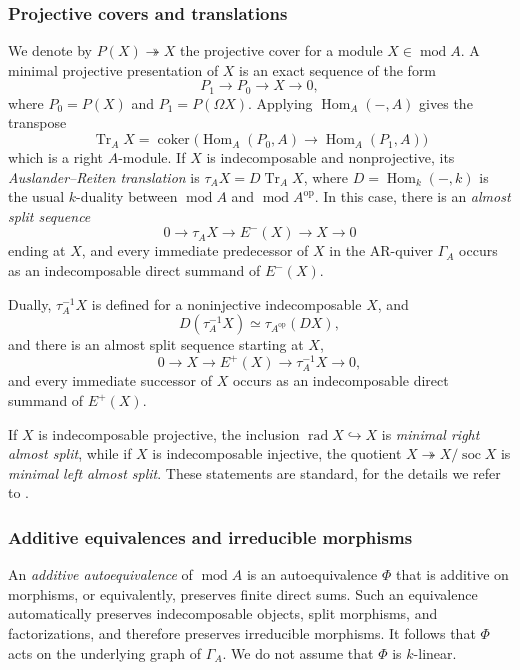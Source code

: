 \documentclass[11pt,letterpaper,reqno]{amsart}
\theoremstyle{definition}
\DeclareMathOperator{\Hom}{Hom}
\DeclareMathOperator{\rad}{rad}
\DeclareMathOperator{\soc}{soc}
\DeclareMathOperator{\Tr}{Tr}
\newcommand{\modcat}{\operatorname{mod}}
\newcommand{\op}{\mathrm{op}}
\begin{document}
\subsubsection{Projective covers and translations} We denote by $P(X)\twoheadrightarrow X$ the projective cover for a module $X\in\modcat A$.  A minimal projective
presentation of $X$ is an exact sequence of the form
\[
P_1\longrightarrow P_0\longrightarrow X\longrightarrow0,\]
where $P_0=P(X)$ and $P_1=P(\Omega X).$
Applying $\Hom_A(-,A)$ gives the transpose
\begin{equation}\label{eq:tr}
\Tr_AX
 =\operatorname{coker}\bigl(
 \Hom_A(P_0,A)\longrightarrow\Hom_A(P_1,A)
 \bigr)
\end{equation}
which is a right $A$-module. 
If $X$ is
indecomposable and nonprojective, its \emph{Auslander--Reiten translation} is $\tau_AX=D\Tr_AX$, where $D=\Hom_k(-,k)$ is the usual $k$-duality between $\modcat A$ and $\modcat A^{\op}$.  
In this case, there is an \emph{almost split sequence}
\[
0\longrightarrow\tau_AX\longrightarrow E^-(X)
\longrightarrow X\longrightarrow0
\]
ending at $X$, and every immediate predecessor of $X$ in the AR-quiver $\Gamma_A$ occurs as an indecomposable direct
summand of $E^-(X)$.  


Dually, $\tau_A^{-1}X$ is defined for a noninjective indecomposable $X$, and
\begin{equation}\label{eq:inverse-translate-duality}
D(\tau_A^{-1}X)\simeq \tau_{A^{\op}}(DX),
\end{equation}
and there is an almost split
sequence starting at $X$,
\[
0\longrightarrow X\longrightarrow E^+(X)
\longrightarrow\tau_A^{-1}X\longrightarrow0,
\]
and every immediate successor of $X$ occurs as an indecomposable direct
summand of $E^+(X)$.  

If $X$ is indecomposable projective, the inclusion
$\rad X\hookrightarrow X$ is \emph{minimal right almost split}, while
if $X$ is indecomposable injective, the quotient
$X\twoheadrightarrow X/\soc X$ is \emph{minimal left almost split}.
 These statements are standard, for the details we refer to 
\cite[Chapters~IV and V]{ARS}.

\subsubsection{Additive equivalences and irreducible morphisms}\label{subsubse:add-equ}


An \emph{additive autoequivalence} of $\modcat A$ is an autoequivalence
$\Phi$ that is additive on morphisms, or equivalently, preserves finite
direct sums.  Such an equivalence automatically preserves indecomposable
objects, split morphisms, and factorizations, and therefore preserves
irreducible morphisms.  It follows that $\Phi$ acts on the underlying graph
of $\Gamma_A$.  We do not assume that $\Phi$ is $k$-linear.
\end{document}
